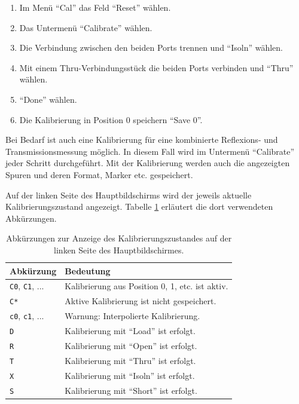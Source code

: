 \documentclass[twoside,a4paper,11pt,halfparskip,DIV=11,notitlepage]{scrartcl}
\begin{document}
\begin{enumerate}
    \item Im Menü ``Cal'' das Feld ``Reset'' wählen.
    \item Das Untermenü ``Calibrate'' wählen.
    \item Die Verbindung zwischen den beiden Ports trennen und ``Isoln'' wählen.
    \item Mit einem Thru-Verbindungsstück die beiden Ports verbinden und ``Thru'' wählen.
    \item ``Done'' wählen.
    \item Die Kalibrierung in Position 0 speichern ``Save 0''.
\end{enumerate}

Bei Bedarf ist auch eine Kalibrierung für eine kombinierte Reflexions- und Transmissionsmessung
möglich. In diesem Fall wird im Untermenü ``Calibrate'' jeder Schritt durchgeführt. Mit der
Kalibrierung werden auch die angezeigten Spuren und deren Format, Marker etc. gespeichert.

Auf der linken Seite des Hauptbildschirms wird der jeweils aktuelle Kalibrierungszustand
angezeigt. Tabelle \ref{tab:calibration} erläutert die dort verwendeten Abkürzungen.

\begin{table}
    \begin{center}
        \caption{Abkürzungen zur Anzeige des Kalibrierungszustandes auf der linken Seite des
        Hauptbildschirmes.}
        \label{tab:calibration}
        \begin{tabular}{ll}\toprule
            \textbf{Abkürzung} & \textbf{Bedeutung}\\\midrule
            \texttt{C0}, \texttt{C1}, ... & Kalibrierung aus Position 0, 1, etc. ist aktiv.\\
            \texttt{C*} & Aktive Kalibrierung ist nicht gespeichert.\\
            \texttt{c0}, \texttt{c1}, ... & Warnung: Interpolierte Kalibrierung.\\
            \texttt{D} & Kalibrierung mit ``Load'' ist erfolgt.\\
            \texttt{R} & Kalibrierung mit ``Open'' ist erfolgt.\\
            \texttt{T} & Kalibrierung mit ``Thru'' ist erfolgt.\\
            \texttt{X} & Kalibrierung mit ``Isoln'' ist erfolgt.\\
            \texttt{S} & Kalibrierung mit ``Short'' ist erfolgt.\\
            \bottomrule
        \end{tabular}
    \end{center}
\end{table}
\end{document}
